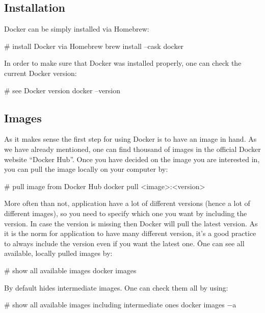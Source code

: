 \ee

\subsection{Installation}

Docker can be simply installed via Homebrew:

\begin{bash}
# install Docker via Homebrew
brew install --cask docker
\end{bash}

In order to make sure that Docker was installed properly, one can check the current Docker version:

\begin{bash}
# see Docker version
docker --version
\end{bash}

\subsection{Images}

As it makes sense the first step for using Docker is to have an image in hand. As we have already mentioned, one can
find thousand of images in the official Docker website ``Docker Hub''. Once you have decided on the image you are
interested in, you can pull the image locally on your computer by:

\begin{bash}
# pull image from Docker Hub
docker pull <image>:<version>
\end{bash}

More often than not, application have a lot of different versions (hence a lot of different images), so you need to
specify which one you want by including the version. In case the version is missing then Docker will pull the latest
version. As it is the norm for application to have many different version, it's a good practice to always include the
version even if you want the latest one. \v

One can see all available, locally pulled images by:

\begin{bash}
# show all available images
docker images
\end{bash}

By default  hides intermediate images. One can check them all by using:

\begin{bash}
# show all available images including intermediate ones
docker images $-$a
\end{bash}

